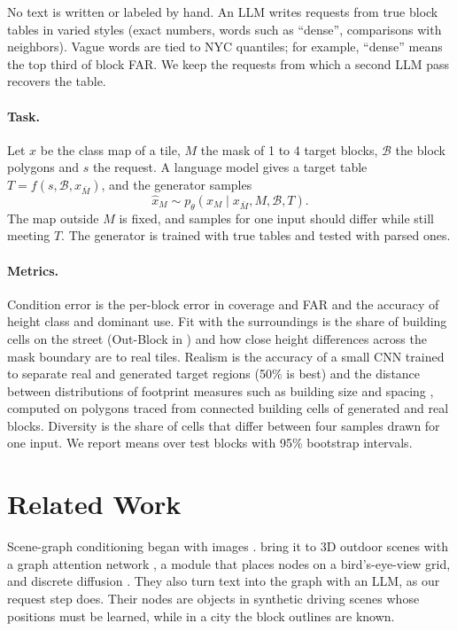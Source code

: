 \documentclass[twocolumn,11pt]{article}
\begin{document}
No text is written or labeled by hand. An LLM writes requests from true block tables in varied styles (exact numbers, words such as ``dense'', comparisons with neighbors). Vague words are tied to NYC quantiles; for example, ``dense'' means the top third of block FAR. We keep the requests from which a second LLM pass recovers the table.

\paragraph{Task.} Let $x$ be the class map of a tile, $M$ the mask of 1 to 4 target blocks, $\mathcal{B}$ the block polygons and $s$ the request. A language model gives a target table $T = f(s, \mathcal{B}, x_{\bar M})$, and the generator samples
\begin{equation}
    \hat{x}_M \sim p_\theta\left(x_M \mid x_{\bar M}, M, \mathcal{B}, T\right).
\end{equation}
The map outside $M$ is fixed, and samples for one input should differ while still meeting $T$. The generator is trained with true tables and tested with parsed ones.

\paragraph{Metrics.} Condition error is the per-block error in coverage and FAR and the accuracy of height class and dominant use. Fit with the surroundings is the share of building cells on the street (Out-Block in \citet{he2023globalmapper}) and how close height differences across the mask boundary are to real tiles. Realism is the accuracy of a small CNN trained to separate real and generated target regions (50\% is best) and the distance between distributions of footprint measures such as building size and spacing \citep{fleischmann2019momepy}, computed on polygons traced from connected building cells of generated and real blocks. Diversity is the share of cells that differ between four samples drawn for one input. We report means over test blocks with 95\% bootstrap intervals.


\section{Related Work}
Scene-graph conditioning began with images \citep{johnson2018sg2im}. \citet{liu2025controllable} bring it to 3D outdoor scenes with a graph attention network \citep{velickovic2018gat}, a module that places nodes on a bird's-eye-view grid, and discrete diffusion \citep{austin2021d3pm}. They also turn text into the graph with an LLM, as our request step does. Their nodes are objects in synthetic driving scenes whose positions must be learned, while in a city the block outlines are known.
\end{document}
